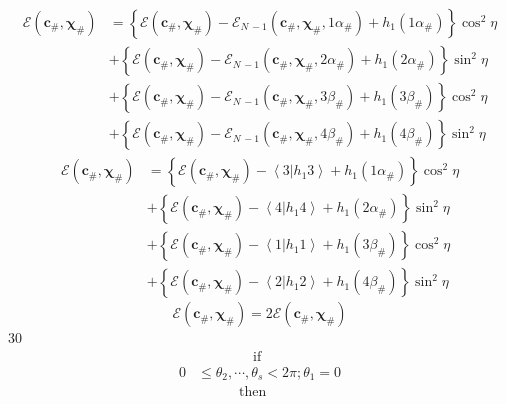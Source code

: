 \documentclass[aps,preprint]{revtex4}%
\begin{document}
\begin{align*}
\mathcal{E}\left(  \mathbf{c}_{\#},\mathbf{\chi}_{\#}\right)   &  =\left\{
\mathcal{E}\left(  \mathbf{c}_{\#},\mathbf{\chi}_{\#}\right)  -\mathcal{E}%
_{N\,-1}\left(  \mathbf{c}_{\#},\mathbf{\chi}_{\#}\mathbf{,}1\alpha
_{\#}\right)  +h_{1}\left(  1\alpha_{\#}\right)  \right\}  \cos^{2}\eta\\
&  +\left\{  \mathcal{E}\left(  \mathbf{c}_{\#},\mathbf{\chi}_{\#}\right)
-\mathcal{E}_{N\,-1}\left(  \mathbf{c}_{\#},\mathbf{\chi}_{\#}\mathbf{,}%
2\alpha_{\#}\right)  +h_{1}\left(  2\alpha_{\#}\right)  \right\}  \sin^{2}%
\eta\\
&  +\left\{  \mathcal{E}\left(  \mathbf{c}_{\#},\mathbf{\chi}_{\#}\right)
-\mathcal{E}_{N\,-1}\left(  \mathbf{c}_{\#},\mathbf{\chi}_{\#}\mathbf{,}%
3\beta_{\#}\right)  +h_{1}\left(  3\beta_{\#}\right)  \right\}  \cos^{2}\eta\\
&  +\left\{  \mathcal{E}\left(  \mathbf{c}_{\#},\mathbf{\chi}_{\#}\right)
-\mathcal{E}_{N\,-1}\left(  \mathbf{c}_{\#},\mathbf{\chi}_{\#}\mathbf{,}%
4\beta_{\#}\right)  +h_{1}\left(  4\beta_{\#}\right)  \right\}  \sin^{2}\eta
\end{align*}%
\begin{align*}
\mathcal{E}\left(  \mathbf{c}_{\#},\mathbf{\chi}_{\#}\right)   &  =\left\{
\mathcal{E}\left(  \mathbf{c}_{\#},\mathbf{\chi}_{\#}\right)  -\left\langle
3\left\vert h_{1}3\right.  \right\rangle +h_{1}\left(  1\alpha_{\#}\right)
\right\}  \cos^{2}\eta\\
&  +\left\{  \mathcal{E}\left(  \mathbf{c}_{\#},\mathbf{\chi}_{\#}\right)
-\left\langle 4\left\vert h_{1}4\right.  \right\rangle +h_{1}\left(
2\alpha_{\#}\right)  \right\}  \sin^{2}\eta\\
&  +\left\{  \mathcal{E}\left(  \mathbf{c}_{\#},\mathbf{\chi}_{\#}\right)
-\left\langle 1\left\vert h_{1}1\right.  \right\rangle +h_{1}\left(
3\beta_{\#}\right)  \right\}  \cos^{2}\eta\\
&  +\left\{  \mathcal{E}\left(  \mathbf{c}_{\#},\mathbf{\chi}_{\#}\right)
-\left\langle 2\left\vert h_{1}2\right.  \right\rangle +h_{1}\left(
4\beta_{\#}\right)  \right\}  \sin^{2}\eta
\end{align*}%
\[
\mathcal{E}\left(  \mathbf{c}_{\#},\mathbf{\chi}_{\#}\right)  =2\mathcal{E}%
\left(  \mathbf{c}_{\#},\mathbf{\chi}_{\#}\right)
\]
30%
\begin{align*}
&  \qquad\qquad\text{if }\\
0 &  \leq\theta_{2},\cdots,\theta_{s}<2\pi;\theta_{1}=0\\
&  \qquad\quad\text{then}%
\end{align*}%
\end{document}
